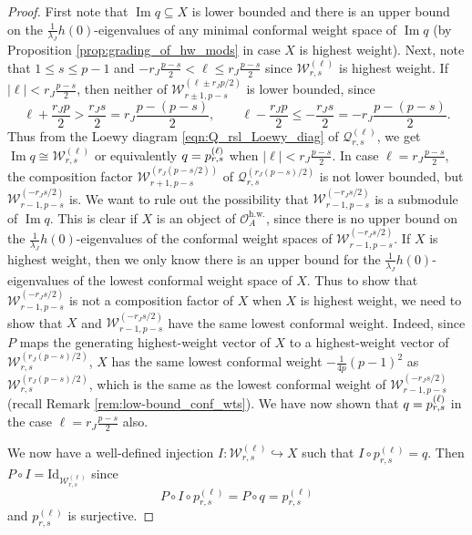\documentclass[11pt, reqno]{amsart}
\theoremstyle{definition}\newtheorem{defi}[thm]{Definition}
\theoremstyle{definition}\newtheorem{rem}[thm]{Remark}
\theoremstyle{definition}\newtheorem{exam}[thm]{Example}
\theoremstyle{definition}\newtheorem{assum}[thm]{Assumption}
\newcommand{\cO}{\mathcal{O}}
\newcommand{\cW}{\mathcal{W}}
\newcommand{\cQ}{\mathcal{Q}}
\newcommand{\Id}{\mathrm{Id}}
\DeclareMathOperator{\im}{Im}
\let\ker\relax
\DeclareMathOperator{\ker}{Ker}
\begin{document}
\begin{proof}
First note that $\im q\subseteq X$ is lower bounded and there is an upper bound on the $\frac{1}{\lambda_J}h(0)$-eigenvalues of any minimal conformal weight space of $\im q$ (by Proposition \ref{prop:grading_of_hw_mods} in case $X$ is highest weight). Next, note that  $1\leq s\leq p-1$ and $-r_J\frac{p-s}{2}<\ell\leq r_J\frac{p-s}{2}$ since $\cW_{r,s}^{(\ell)}$ is highest weight. If $\vert\ell\vert <r_J\frac{p-s}{2}$, then neither of $\cW_{r\pm 1,p-s}^{(\ell\pm r_J p/2)}$ is lower bounded, since 
\begin{equation*}
\ell+\frac{r_Jp}{2}>\frac{r_Js}{2}=r_J\frac{p-(p-s)}{2},\qquad \ell-\frac{r_Jp}{2}\leq-\frac{r_J s}{2}=-r_J\frac{p-(p-s)}{2}.
\end{equation*}
Thus from the Loewy diagram \eqref{eqn:Q_rsl_Loewy_diag} of $\cQ_{r,s}^{(\ell)}$, we get $\im q\cong\cW_{r,s}^{(\ell)}$ or equivalently $\ker q=\ker p_{r,s}^{(\ell)}$ when $\vert\ell\vert<r_J\frac{p-s}{2}$. In case $\ell=r_J\frac{p-s}{2}$, the composition factor $\cW_{r+1,p-s}^{(r_J(p-s/2))}$ of $\cQ_{r,s}^{(r_J(p-s)/2)}$ is not lower bounded, but $\cW_{r-1,p-s}^{(-r_Js/2)}$ is. We want to rule out the possibility that $\cW_{r-1,p-s}^{(-r_Js/2)}$ is a submodule of $\im q$. This is clear if $X$ is an object of $\cO_A^{\mathrm{h.w.}}$, since there is no upper bound on the $\frac{1}{\lambda_J}h(0)$-eigenvalues of the conformal weight spaces of $\cW_{r-1,p-s}^{(-r_Js/2)}$. If $X$ is highest weight, then we only know there is an upper bound for the $\frac{1}{\lambda_J}h(0)$-eigenvalues of the lowest conformal weight space of $X$. Thus to show that $\cW_{r-1,p-s}^{(-r_Js/2)}$ is not a composition factor of $X$ when $X$ is highest weight, we need to show that $X$ and $\cW_{r-1,p-s}^{(-r_Js/2)}$ have the same lowest conformal weight. Indeed, since $P$ maps the generating highest-weight vector of $X$ to a highest-weight vector of $\cW_{r,s}^{(r_J(p-s)/2)}$, $X$ has the same lowest conformal weight $-\frac{1}{4p}(p-1)^2$ as $\cW_{r,s}^{(r_J(p-s)/2)}$, which is the same as the lowest conformal weight of $\cW_{r-1,p-s}^{(-r_Js/2)}$ (recall Remark \ref{rem:low-bound_conf_wts}). We have now shown that $\ker q=\ker p_{r,s}^{(\ell)}$ in the case $\ell=r_J\frac{p-s}{2}$ also.




We now have a well-defined injection $I:\cW_{r,s}^{(\ell)}\hookrightarrow X$ such that $I\circ p_{r,s}^{(\ell)}=q$. Then $P\circ I=\Id_{\cW_{r,s}^{(\ell)}}$ since
\begin{equation*}
P\circ I\circ p_{r,s}^{(\ell)} =P\circ q= p_{r,s}^{(\ell)}
\end{equation*}
and $p_{r,s}^{(\ell)}$ is surjective.
\end{proof}
\end{document}
